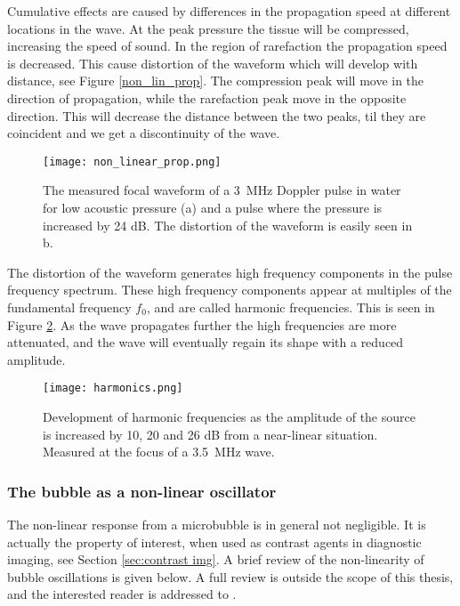 Cumulative effects are caused by differences in the propagation speed at different locations in the wave. At the peak pressure the tissue will be compressed, increasing the speed of sound. In the region of rarefaction the propagation speed is decreased.  This cause distortion of the waveform which will develop with distance, see Figure \ref{non_lin_prop}. The compression peak will move in the direction of propagation, while the rarefaction peak move in the opposite direction. This will decrease the distance between the two peaks, til they are coincident and we get a discontinuity of the wave.  

\begin{figure}[h]
  \centering
  \label{Fig:non_lin_prop}
  \texttt{[image: non\_linear\_prop.png]}
  \caption{The measured focal waveform of a \SI{3}{\mega\hertz} Doppler pulse in water for low acoustic pressure (a) and a pulse where the pressure is increased by 24 dB. The distortion of the waveform is easily seen in b\cite{Uck2002}.}
\end{figure} 

The distortion of the waveform generates high frequency components in the pulse frequency spectrum. These high frequency components appear at multiples of the fundamental frequency $f_0$, and are called harmonic frequencies. This is seen in Figure \ref{Fig:harmonics}. As the wave propagates further the high frequencies are more attenuated, and the wave will eventually regain its shape with a reduced amplitude. 

\begin{figure}[h]
  \centering
  \label{Fig:harmonics}
  \texttt{[image: harmonics.png]}
  \caption{Development of harmonic frequencies as the amplitude of the source is increased by 10, 20 and 26 dB from a near-linear situation. Measured at the focus of a \SI{3.5}{\mega\hertz} wave\cite{Uck2002}.}
\end{figure} 


\subsubsection{The bubble as a non-linear oscillator}
The non-linear response from a microbubble is in general not negligible. It is actually the property of interest, when used as contrast agents in diagnostic imaging, see Section \ref{sec:contrast img}. A brief review of the non-linearity of bubble oscillations is given below. A full review is outside the scope of this thesis, and the interested reader is addressed to \cite{Hoff2000}. 

